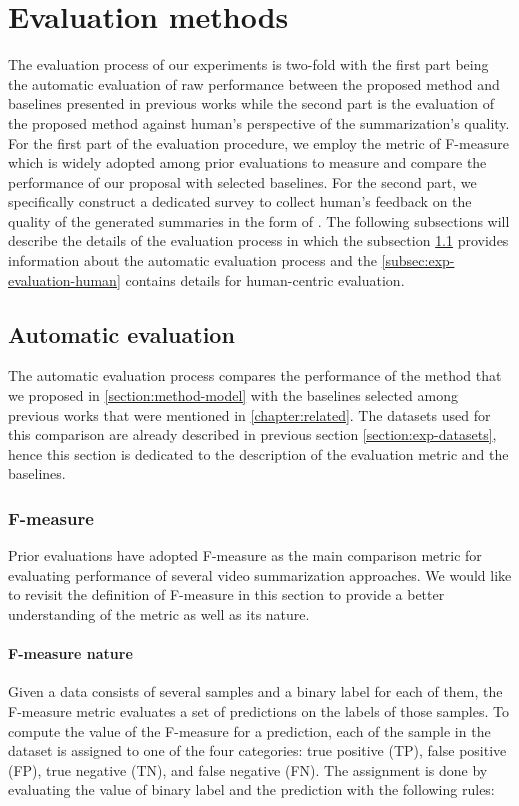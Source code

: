 \section{Evaluation methods}
\label{section:exp-evaluation}

The evaluation process of our experiments is two-fold with the first part being the automatic evaluation of raw performance between the proposed method and baselines presented in previous works while the second part is the evaluation of the proposed method against human's perspective of the summarization's quality. For the first part of the evaluation procedure, we employ the metric of F-measure which is widely adopted among prior evaluations to measure and compare the performance of our proposal with selected baselines. For the second part, we specifically construct a dedicated survey to collect human's feedback on the quality of the generated summaries in the form of . The following subsections will describe the details of the evaluation process in which the subsection \ref{subsec:exp-evaluation-automatic} provides information about the automatic evaluation process and the \ref{subsec:exp-evaluation-human} contains details for human-centric evaluation.

\subsection{Automatic evaluation}
\label{subsec:exp-evaluation-automatic}
    The automatic evaluation process compares the performance of the method that we proposed in \ref{section:method-model} with the baselines selected among previous works that were mentioned in \ref{chapter:related}. The datasets used for this comparison are already described in previous section \ref{section:exp-datasets}, hence this section is dedicated to the description of the evaluation metric and the baselines.

    \subsubsection{F-measure}
    \label{subsubsec:exp-evaluation-automatic-fmeasure}
        Prior evaluations have adopted F-measure as the main comparison metric for evaluating performance of several video summarization approaches. We would like to revisit the definition of F-measure in this section to provide a better understanding of the metric as well as its nature.

        \paragraph[long]{F-measure nature}
            Given a data consists of several samples and a binary label for each of them, the F-measure metric evaluates a set of predictions on the labels of those samples. To compute the value of the F-measure for a prediction, each of the sample in the dataset is assigned to one of the four categories: true positive (TP), false positive (FP), true negative (TN), and false negative (FN). The assignment is done by evaluating the value of binary label and the prediction with the following rules:
            
